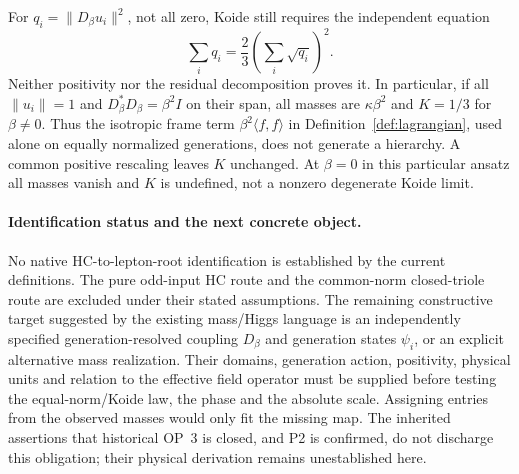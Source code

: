 For $q_i=\|D_\beta u_i\|^2$, not all zero, Koide still requires
the independent equation
\[
 \sum_i q_i=\frac23\left(\sum_i\sqrt{q_i}\right)^2.
\]
Neither positivity nor the residual decomposition proves it.
In particular, if all $\|u_i\|=1$ and
$D_\beta^*D_\beta=\beta^2 I$ on their span, all masses are
$\kappa\beta^2$ and $K=1/3$ for $\beta\ne0$. Thus the isotropic
frame term $\beta^2\langle f,f\rangle$ in
Definition~\ref{def:lagrangian}, used alone on equally normalized
generations, does not generate a hierarchy. A common positive
rescaling leaves $K$ unchanged. At $\beta=0$ in this particular
ansatz all masses vanish and $K$ is undefined, not a nonzero
degenerate Koide limit.

\paragraph{Identification status and the next concrete object.}
No native HC-to-lepton-root identification is established by the
current definitions. The pure odd-input HC route and the common-norm
closed-triole route are excluded under their stated assumptions.
The remaining constructive target suggested by the existing
mass/Higgs language is an independently specified generation-resolved
coupling $D_\beta$ and generation states $\psi_i$, or an explicit
alternative mass realization. Their domains, generation action,
positivity, physical units and relation to the effective field
operator must be supplied before testing the equal-norm/Koide law,
the phase and the absolute scale. Assigning entries from the observed
masses would only fit the missing map. The inherited assertions that
historical OP~3 is closed, and P2 is confirmed, do not discharge this
obligation; their physical derivation remains unestablished here.
